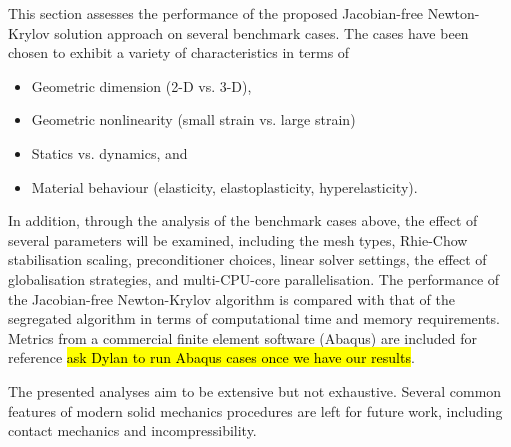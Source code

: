 \documentclass[sn-mathphys,Numbered]{sn-jnl}%
\begin{document}
%	

This section assesses the performance of the proposed Jacobian-free Newton-Krylov solution approach on several benchmark cases.
The cases have been chosen to exhibit a variety of characteristics in terms of
\begin{itemize}
	\item Geometric dimension (2-D vs. 3-D),
	\item Geometric nonlinearity (small strain vs. large strain)
	\item Statics vs. dynamics, and
	\item Material behaviour (elasticity, elastoplasticity, hyperelasticity).
\end{itemize}

In addition, through the analysis of the benchmark cases above, the effect of several parameters will be examined, including the mesh types, Rhie-Chow stabilisation scaling, preconditioner choices, linear solver settings, the effect of globalisation strategies, and multi-CPU-core parallelisation.
The performance of the Jacobian-free Newton-Krylov algorithm is compared with that of the segregated algorithm in terms of computational time and memory requirements.
Metrics from a commercial finite element software (Abaqus) are included for reference \hl{ask Dylan to run Abaqus cases once we have our results}.

The presented analyses aim to be extensive but not exhaustive.
Several common features of modern solid mechanics procedures are left for future work, including contact mechanics and incompressibility. %
\end{document}
